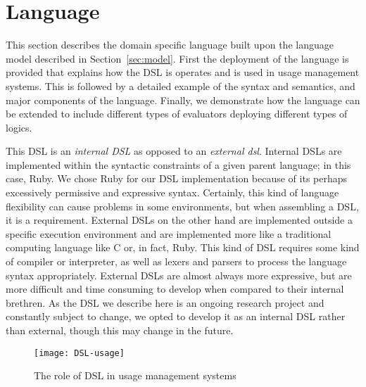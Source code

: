 \section{Language}\label{sec:language}
This section describes the domain specific language built upon the language model described in Section~\ref{sec:model}. First the deployment of the language is provided that explains how the DSL is operates and is used in usage management systems. This is followed by a detailed example of the syntax and semantics, and major components of the language. Finally, we demonstrate how the language can be extended to include different types of evaluators deploying different types of logics.

This DSL is an {\em internal DSL} as opposed to an {\em external dsl}.  Internal DSLs are implemented within the syntactic constraints of a given parent language; in this case, Ruby.  We chose Ruby for our DSL implementation because of its perhaps excessively permissive and expressive syntax.  Certainly, this kind of language flexibility can cause problems in some environments, but when assembling a DSL, it is a requirement.  External DSLs on the other hand are implemented outside a specific execution environment and are implemented more like a traditional computing language like C or, in fact, Ruby. This kind of DSL requires some kind of compiler or interpreter, as well as lexers and parsers to process the language syntax appropriately.  External DSLs are almost always more expressive, but are more difficult and time consuming to develop when compared to their internal brethren.  As the DSL we describe here is an ongoing research project and constantly subject to change, we opted to develop it as an internal DSL rather than external, though this may change in the future.

\begin{figure}[!t]
\centering
\texttt{[image: DSL-usage]}
\caption{The role of DSL in usage management systems}
\label{fig:DSL-usage}
\end{figure}

